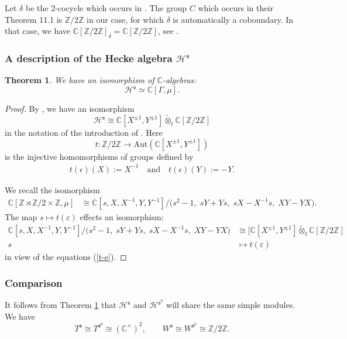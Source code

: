 \documentclass[11pt]{amsart}
\newtheorem{theorem}{Theorem}[section]
\theoremstyle{remark}
\theoremstyle{definition}
\newcommand{\Z}{\mathbb{Z}}
\newcommand{\C}{\mathbb{C}}
\newcommand{\cH}{\mathcal{H}}
\newcommand{\fs}{\mathfrak{s}}
\begin{document}
Let $\delta$ be the $2$-cocycle which occurs in \cite[Theorem 11.1]{GR2}.  The group $C$ which occurs in their Theorem  11.1 is $\Z/2\Z$ in our case, for which $\delta$ is automatically a coboundary. In that case, we have
$\C[\Z/2\Z]_\delta = \C[\Z/2\Z]$, see \cite[\S11.1, \S11.7]{GR2}.


\subsubsection{A description of the Hecke algebra $\cH^\fs$}

\begin{theorem}\label{cHcH} We have an isomorphism of $\C$-algebras: 
\[\cH^\fs\simeq \C[\Gamma,\mu].\]
\end{theorem}
\begin{proof}
By \cite[\S11.8]{GR2}, we have an isomorphism 
\[
\cH^{\fs} \cong \C[X^{\pm 1},Y^{\pm 1}]\widetilde\otimes_t \C[\Z/2\Z]
\]
in the notation of  the introduction of \cite{GR2}. Here 
\[t\colon \Z/2\Z\to\mathrm{Aut}(\C[X^{\pm 1},Y^{\pm 1}])\]
is the injective homomorphisms of groups defined by 
\begin{align}\label{t-e}
t(\epsilon)(X):=X^{-1}\quad\text{and}\quad t(\epsilon)(Y):=-Y.
\end{align}

We recall the isomorphism
\begin{align*}
\C[\Z\rtimes\Z/2 \times \Z, \mu]  & \cong \C[s,X,X^{-1},Y,Y^{-1}] \Big/\bigl(s^2-1,\; sY+Ys,\; sX-X^{-1}s,\; XY-YX\bigr).
 \end{align*}
The map $s \mapsto t(\varepsilon)$ effects an isomorphism: 
\begin{align*}
 \C[s,X,X^{-1},Y,Y^{-1}] \Big/\bigl(s^2-1,\; sY+Ys,\; sX-X^{-1}s,\; XY-YX\bigr)  & \cong [\C[X^{\pm 1},Y^{\pm 1}]\widetilde\otimes_t \C[\Z/2\Z]\\
 s & \mapsto t(\varepsilon)
 \end{align*}
 in view of the equations (\ref{t-e}).   
\end{proof}


\subsubsection{Comparison}   It follows from Theorem \ref{cHcH} that $\cH^\fs$ and $\cH^{\fs^0}$ will share the same simple modules.     We have 
\[
T^\fs \cong T^{\fs^0} \cong (\C^\times)^2, \qquad W^\fs \cong W^{\fs^0} \cong \Z/2\Z.
\]
\end{document}
